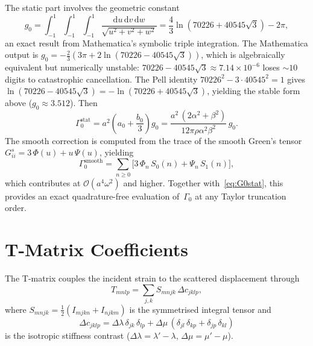 \documentclass[11pt,a4paper]{article}
\newcommand{\dd}{\mathrm{d}}
\newcommand{\order}[1]{\mathcal{O}\!\left(#1\right)}
\newcommand{\Dlam}{\Delta\lambda}
\newcommand{\Dmu}{\Delta\mu}
\begin{document}
The static part involves the geometric constant
\begin{equation}
  g_0 = \int_{-1}^{1}\!\!\int_{-1}^{1}\!\!\int_{-1}^{1}
    \frac{\dd u\,\dd v\,\dd w}{\sqrt{u^2 + v^2 + w^2}}
  = \frac{4}{3}\ln\!\left(70226 + 40545\sqrt{3}\right) - 2\pi,
  \label{eq:g0}
\end{equation}
an exact result from Mathematica's symbolic triple integration.
The Mathematica output is
$g_0 = -\tfrac{2}{3}(3\pi + 2\ln(70226 - 40545\sqrt{3}))$,
which is algebraically equivalent but numerically unstable:
$70226 - 40545\sqrt{3} \approx 7.14 \times 10^{-6}$ loses
${\sim}10$ digits to catastrophic cancellation. The Pell identity
$70226^2 - 3 \cdot 40545^2 = 1$ gives
$\ln(70226 - 40545\sqrt{3}) = -\ln(70226 + 40545\sqrt{3})$,
yielding the stable form above ($g_0 \approx 3.512$).
Then
\begin{equation}
  \Gamma_0^\text{stat}
  = a^2\!\left(a_0 + \frac{b_0}{3}\right) g_0
  = \frac{a^2\,(2\alpha^2 + \beta^2)}{12\pi\rho\alpha^2\beta^2}
    \,g_0.
  \label{eq:G0stat}
\end{equation}
The smooth correction is computed from the trace of the smooth
Green's tensor $G^s_{ii} = 3\,\Phi(u) + u\,\Psi(u)$, yielding
\begin{equation}
  \Gamma_0^\text{smooth}
  = \sum_{n \geq 0}\bigl[3\,\Phi_n\,S_0(n)
    + \Psi_n\,S_1(n)\bigr],
  \label{eq:G0smooth}
\end{equation}
which contributes at $\order{a^4\omega^2}$ and higher. Together
with~\eqref{eq:G0stat}, this provides an exact quadrature-free
evaluation of~$\Gamma_0$ at any Taylor truncation order.

\section{T-Matrix Coefficients}
\label{sec:tmatrix}

The T-matrix couples the incident strain to the scattered
displacement through
\begin{equation}
  T_{mnlp} = \sum_{j,k}
    S_{mnjk}\,\Delta c_{jklp},
  \label{eq:Tcoupling}
\end{equation}
where $S_{mnjk} = \tfrac{1}{2}(I_{mjkn} + I_{njkm})$ is the
symmetrised integral tensor and
\begin{equation}
  \Delta c_{jklp} = \Dlam\,\delta_{jk}\,\delta_{lp}
    + \Dmu\,(\delta_{jl}\,\delta_{kp} + \delta_{jp}\,\delta_{kl})
  \label{eq:Dc}
\end{equation}
is the isotropic stiffness contrast
($\Dlam = \lambda' - \lambda$, $\Dmu = \mu' - \mu$).
\end{document}
